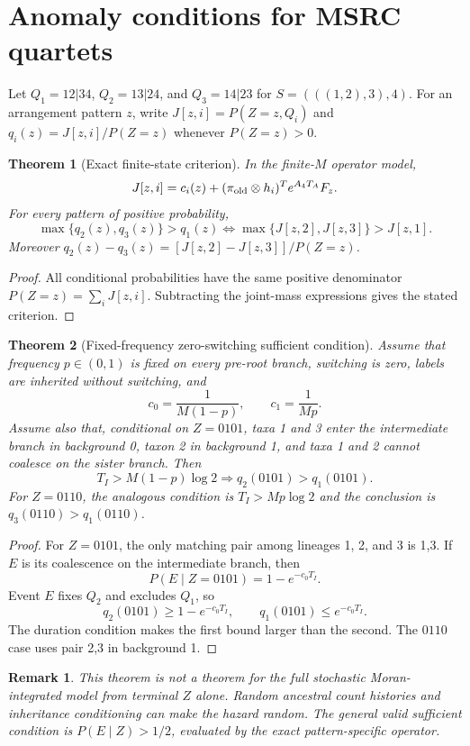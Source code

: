 \documentclass[11pt]{article}
\newtheorem{theorem}{Theorem}
\newtheorem{remark}{Remark}
\begin{document}
\section*{Anomaly conditions for MSRC quartets}

Let $Q_1=12|34$, $Q_2=13|24$, and $Q_3=14|23$ for
$S=(((1,2),3),4)$. For an arrangement pattern $z$, write
$J[z,i]=P(Z=z,Q_i)$ and $q_i(z)=J[z,i]/P(Z=z)$ whenever
$P(Z=z)>0$.

\begin{theorem}[Exact finite-state criterion]
In the finite-$M$ operator model,
\[
J[z,i]=c_i(z)+(\pi_{\rm old}\otimes h_i)^T e^{A_4T_A}F_z.
\]
For every pattern of positive probability,
\[
\max\{q_2(z),q_3(z)\}>q_1(z)
\iff
\max\{J[z,2],J[z,3]\}>J[z,1].
\]
Moreover $q_2(z)-q_3(z)=[J[z,2]-J[z,3]]/P(Z=z)$.
\end{theorem}

\begin{proof}
All conditional probabilities have the same positive denominator
$P(Z=z)=\sum_iJ[z,i]$. Subtracting the joint-mass expressions gives the
stated criterion.
\end{proof}

\begin{theorem}[Fixed-frequency zero-switching sufficient condition]
Assume that frequency $p\in(0,1)$ is fixed on every pre-root branch,
switching is zero, labels are inherited without switching, and
\[
c_0=\frac{1}{M(1-p)},\qquad c_1=\frac{1}{Mp}.
\]
Assume also that, conditional on $Z=0101$, taxa 1 and 3 enter the
intermediate branch in background 0, taxon 2 in background 1, and taxa 1 and
2 cannot coalesce on the sister branch. Then
\[
T_I>M(1-p)\log 2\Longrightarrow q_2(0101)>q_1(0101).
\]
For $Z=0110$, the analogous condition is $T_I>Mp\log2$ and the conclusion
is $q_3(0110)>q_1(0110)$.
\end{theorem}

\begin{proof}
For $Z=0101$, the only matching pair among lineages 1, 2, and 3 is 1,3.
If $E$ is its coalescence on the intermediate branch, then
\[
P(E\mid Z=0101)=1-e^{-c_0T_I}.
\]
Event $E$ fixes $Q_2$ and excludes $Q_1$, so
\[
q_2(0101)\ge1-e^{-c_0T_I},\qquad q_1(0101)\le e^{-c_0T_I}.
\]
The duration condition makes the first bound larger than the second. The
$0110$ case uses pair 2,3 in background 1.
\end{proof}

\begin{remark}
This theorem is not a theorem for the full stochastic Moran-integrated model
from terminal $Z$ alone. Random ancestral count histories and inheritance
conditioning can make the hazard random. The general valid sufficient
condition is $P(E\mid Z)>1/2$, evaluated by the exact pattern-specific
operator.
\end{remark}
\end{document}

